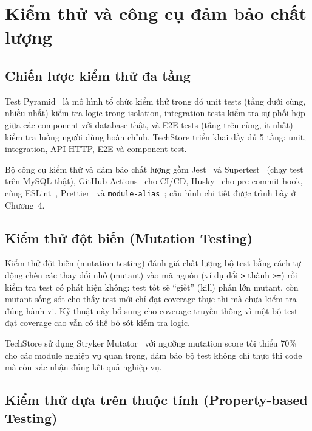 \section{Kiểm thử và công cụ đảm bảo chất lượng}
\label{sec:c2_quality}

\subsection{Chiến lược kiểm thử đa tầng}

Test Pyramid~\cite{fowler2012test_pyramid} là mô hình tổ chức kiểm thử trong đó unit tests (tầng dưới cùng, nhiều nhất) kiểm tra logic trong isolation, integration tests kiểm tra sự phối hợp giữa các component với database thật, và E2E tests (tầng trên cùng, ít nhất) kiểm tra luồng người dùng hoàn chỉnh. TechStore triển khai đầy đủ 5 tầng: unit, integration, API HTTP, E2E và component test.

Bộ công cụ kiểm thử và đảm bảo chất lượng gồm Jest~\cite{jest_docs} và Supertest~\cite{supertest_docs} (chạy test trên MySQL thật), GitHub Actions~\cite{github_actions_docs} cho CI\slash CD, Husky~\cite{husky_docs} cho pre-commit hook, cùng ESLint~\cite{eslint_docs}, Prettier~\cite{prettier_docs} và \texttt{module-alias}~\cite{module_alias_docs}; cấu hình chi tiết được trình bày ở Chương~4.

\subsection{Kiểm thử đột biến (Mutation Testing)}

Kiểm thử đột biến (mutation testing) đánh giá chất lượng bộ test bằng cách tự động chèn các thay đổi nhỏ (mutant) vào mã nguồn (ví dụ đổi \texttt{>} thành \texttt{>=}) rồi kiểm tra test có phát hiện không: test tốt sẽ ``giết'' (kill) phần lớn mutant, còn mutant sống sót cho thấy test mới chỉ đạt coverage thực thi mà chưa kiểm tra đúng hành vi. Kỹ thuật này bổ sung cho coverage truyền thống vì một bộ test đạt coverage cao vẫn có thể bỏ sót kiểm tra logic.

TechStore sử dụng Stryker Mutator~\cite{stryker_docs} với ngưỡng mutation score tối thiểu 70\% cho các module nghiệp vụ quan trọng, đảm bảo bộ test không chỉ thực thi code mà còn xác nhận đúng kết quả nghiệp vụ.

\subsection{Kiểm thử dựa trên thuộc tính (Property-based Testing)}


